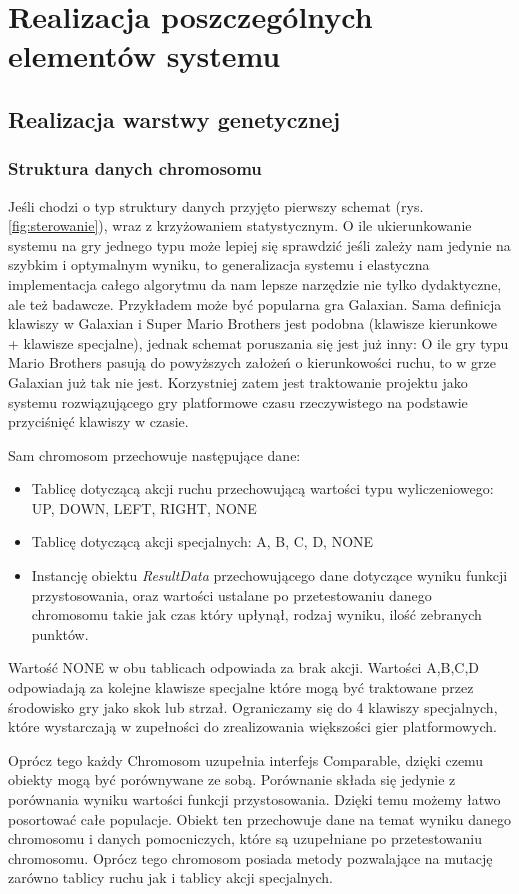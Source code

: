 \section{Realizacja poszczególnych elementów systemu}
\subsection{Realizacja warstwy genetycznej}
\subsubsection{Struktura danych chromosomu}
\begin{par}
	Jeśli chodzi o typ struktury danych przyjęto pierwszy schemat (rys.\ref{fig:sterowanie}), wraz z krzyżowaniem statystycznym. 
	O ile ukierunkowanie systemu na gry jednego typu może lepiej się sprawdzić jeśli zależy nam
	jedynie na szybkim i optymalnym wyniku, to generalizacja systemu i elastyczna implementacja całego algorytmu da nam lepsze narzędzie nie tylko dydaktyczne, ale też badawcze.
	Przykładem może być popularna gra Galaxian. Sama definicja klawiszy w Galaxian i Super Mario Brothers jest podobna (klawisze kierunkowe + klawisze specjalne),
	jednak schemat poruszania się jest już inny: O ile gry typu Mario Brothers pasują do powyższych założeń o kierunkowości ruchu, to w grze Galaxian już tak nie jest.
	Korzystniej zatem jest traktowanie projektu jako systemu rozwiązującego gry platformowe czasu rzeczywistego na podstawie przyciśnięć klawiszy w czasie.
\end{par}
\begin{par}
	
	Sam chromosom przechowuje następujące dane:

	\begin{itemize}
		\item Tablicę dotyczącą akcji ruchu przechowującą wartości typu wyliczeniowego: UP, DOWN, LEFT, RIGHT, NONE
		\item Tablicę dotyczącą akcji specjalnych: A, B, C, D, NONE
		\item Instancję obiektu \textit{ResultData} przechowującego dane dotyczące wyniku funkcji przystosowania, oraz wartości ustalane po przetestowaniu danego chromosomu takie jak czas który upłynął, rodzaj wyniku, ilość zebranych punktów.
	\end{itemize}

	Wartość NONE w obu tablicach odpowiada za brak akcji. 
	Wartości A,B,C,D odpowiadają za kolejne klawisze specjalne które mogą być traktowane przez środowisko gry jako skok lub strzał. 
	Ograniczamy się do 4 klawiszy specjalnych, które wystarczają w zupełności do zrealizowania większości gier platformowych.

	Oprócz tego każdy Chromosom uzupełnia interfejs Comparable, dzięki czemu obiekty mogą być porównywane ze sobą. Porównanie składa się jedynie z porównania wyniku wartości funkcji przystosowania. Dzięki temu możemy łatwo posortować całe populacje.
	Obiekt ten przechowuje dane na temat wyniku danego chromosomu i danych pomocniczych, które są uzupełniane po przetestowaniu chromosomu. 
	Oprócz tego chromosom posiada metody pozwalające na mutację zarówno tablicy ruchu jak i tablicy akcji specjalnych.
\end{par}
